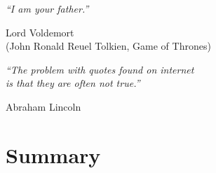 \documentclass[a4paper, 11pt, twoside]{Thesis}  %
\begin{document}
\clearpage  %



\cleardoublepage  %


\maketitleeng
\newpage{\pagestyle{empty}\cleardoublepage}

\pagestyle{empty}  %

\null\vfill
\begin{flushright}
\textit{``I am your father.''}\par
\smallskip
Lord Voldemort \\
(John Ronald Reuel Tolkien, Game of Thrones)
\end{flushright}
\bigskip
\begin{flushright}
\textit{``The problem with quotes found on internet \\
is that they are often not true.''}\par
\smallskip
Abraham Lincoln
\end{flushright}

\vfill\vfill\vfill\vfill\vfill\vfill\null
\clearpage  %



\chapter*{Summary}
\end{document}
